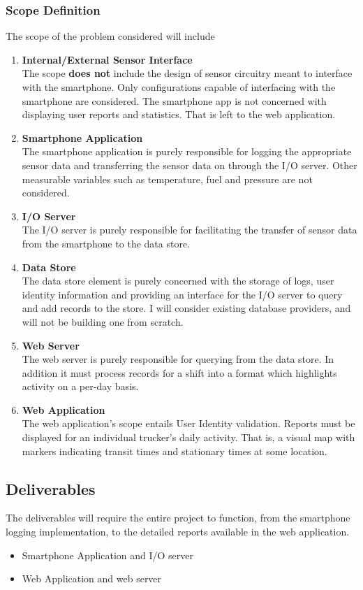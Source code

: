 \subsubsection{Scope Definition}
The scope of the problem considered will include
\begin{enumerate}
\item \textbf{Internal/External Sensor Interface}\\
The scope \textbf{does not} include the design of sensor circuitry meant to interface with the smartphone. Only configurations capable of interfacing with the smartphone are considered.
The smartphone app is not concerned with displaying user reports and statistics. That is left to the web application.
\item \textbf{Smartphone Application}\\
The smartphone application is purely responsible for logging the appropriate sensor data and transferring the sensor data on through the I/O server.
Other measurable variables such as temperature, fuel and pressure are not considered.
\item \textbf{I/O Server}\\
The I/O server is purely responsible for facilitating the transfer of sensor data from the smartphone to the data store.
\item \textbf{Data Store}\\
    The data store element is purely concerned with the storage of logs, user identity information and providing an interface for the I/O server to query and add records to the store.
    I will consider existing database providers, and will not be building one from scratch. 
\item \textbf{Web Server}\\
The web server is purely responsible for querying from the data store. In addition it must process records for a shift into a format which highlights activity on a per-day basis.
\item \textbf{Web Application}\\
The web application's scope entails User Identity validation. Reports must be displayed for an individual trucker's daily activity. That is, a visual map with markers indicating transit times and stationary times at some location. 
\end{enumerate}

\subsection{Deliverables}
The deliverables will require the entire project to function, from the smartphone logging implementation, to the detailed reports available in the web application. 
\begin{itemize}
\item Smartphone Application and I/O server
\item Web Application and web server
\end{itemize}

